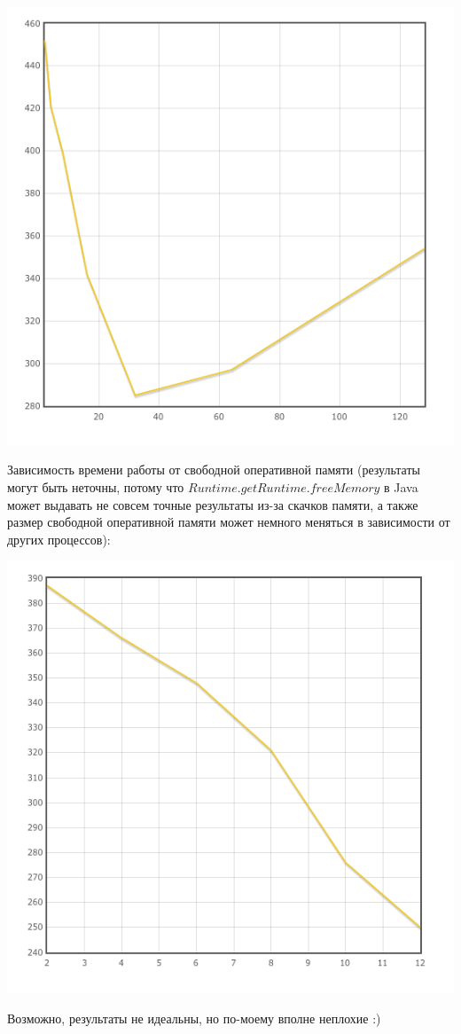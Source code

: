 \documentclass[11pt,a4paper,oneside]{article}
\begin{document}
\includegraphics[natwidth=162bp,natheight=227bp]{img/01.png}

Зависимость времени работы от свободной оперативной памяти (результаты могут быть неточны, потому что $Runtime.getRuntime.freeMemory$ в Java может выдавать не совсем точные результаты из-за скачков памяти, а также размер свободной оперативной памяти может немного меняться в зависимости от других процессов):

\includegraphics[natwidth=162bp,natheight=227bp]{img/03.png}


Возможно, результаты не идеальны, но по-моему вполне неплохие :)
\end{document}
